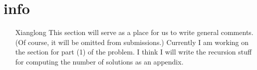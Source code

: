 \section*{info}
\begin{itemize}
	\item[Xianglong] This section will serve as a place for us to write general comments. (Of course, it will be omitted from submissions.) Currently I am working on the section for part (1) of the problem. I think I will write the recursion stuff for computing the number of solutions as an appendix.
\end{itemize}
